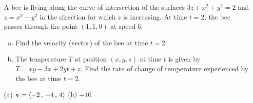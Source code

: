 \begin{question}[M200 2011D] %
A bee is flying along the curve of intersection of the surfaces $3z + x^2 + y^2 = 2$ and
$z = x^2 - y^2$ in the direction for which $z$ is increasing. At time $t = 2$, the bee passes
through the point $(1, 1, 0)$ at speed $6$.
\begin{enumerate}[(a)]
\item
Find the velocity (vector) of the bee at time $t = 2$.
\item
The temperature $T$ at position $(x, y, z)$ at time $t$ is given by $T = xy - 3x+2yt+z$.
Find the rate of change of temperature experienced by the bee at time $t = 2$.
\end{enumerate}
\end{question}

%

\begin{answer}
(a) $\mathbf{v} = \left< -2 \,,\, -4 \,,\, 4 \right>$\qquad
(b) $-10$
\end{answer}

